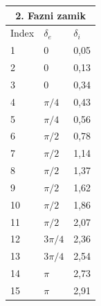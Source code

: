 \begin{tabular}{|p{1.5cm}|p{1.5cm}|p{1.5cm}|}
    \hline
    \multicolumn{3}{|c|}{2. Fazni zamik}\\
    \hline
    Index & $\delta_e$ & $\delta_i$ \\
    \hline
    1 & 0 & 0,05 \\
    2 & 0 & 0,13\\
    3 & 0 & 0,34\\
    4 & $\pi/4$ & 0,43\\
    5 & $\pi/4$ & 0,56\\
    6 & $\pi/2$ & 0,78\\
    7 & $\pi/2$ & 1,14\\
    8 & $\pi/2$ & 1,37\\
    9 & $\pi/2$ & 1,62\\
    10 & $\pi/2$ & 1,86\\
    11 & $\pi/2$ & 2,07\\
    12 & $3\pi/4$ & 2,36\\
    13 & $3\pi/4$ & 2,54\\
    14 & $\pi$ & 2,73\\
    15 & $\pi$ & 2,91\\
    \hline
\end{tabular}

\raggedright \normalsize

